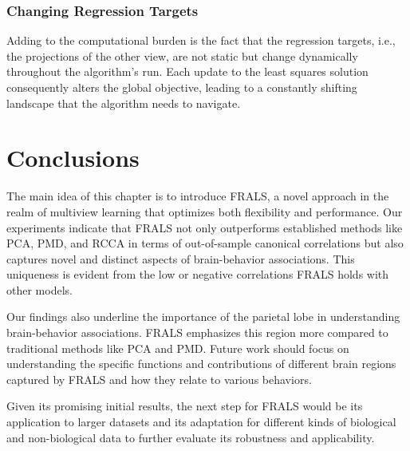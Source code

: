 \subsubsection{Changing Regression Targets}\label{subsec:changing-regression-targets}
Adding to the computational burden is the fact that the regression targets, i.e., the projections of the other view, are not static but change dynamically throughout the algorithm's run.
Each update to the least squares solution consequently alters the global objective, leading to a constantly shifting landscape that the algorithm needs to navigate.


\section{Conclusions}
The main idea of this chapter is to introduce FRALS, a novel approach in the realm of multiview learning that optimizes
both flexibility and performance.
Our experiments indicate that FRALS not only outperforms established methods like PCA, PMD, and RCCA in terms of out-of-sample canonical correlations but also captures novel and distinct aspects of brain-behavior associations.
This uniqueness is evident from the low or negative correlations FRALS holds with other models.

Our findings also underline the importance of the parietal lobe in understanding brain-behavior associations.
FRALS emphasizes this region more compared to traditional methods like PCA and PMD. Future work should focus on understanding the specific functions and contributions of different brain regions captured by FRALS and how they relate to various behaviors.

Given its promising initial results, the next step for FRALS would be its application to larger datasets and its adaptation for different kinds of biological and non-biological data to further evaluate its robustness and applicability.






